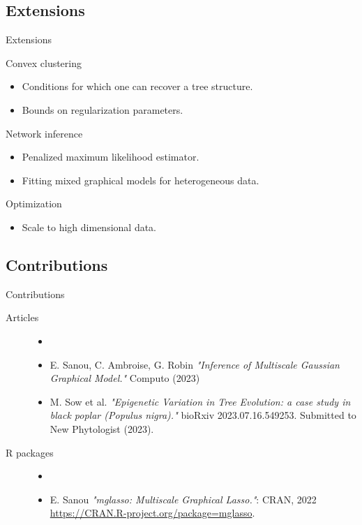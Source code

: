 \documentclass[11pt]{beamer}
\newcommand{\emphase}[1]{\textcolor{Complement}{#1}}
\begin{document}
\subsection{Extensions}
\begin{frame}{Extensions}
\begin{block}{Convex clustering}
\begin{itemize}
\item Conditions for which one can recover a tree structure.
\item Bounds on regularization parameters.
\end{itemize}
\end{block}

\begin{block}{Network inference}
\begin{itemize}
\item Penalized maximum likelihood estimator.
\item Fitting \emphase{mixed graphical models} for heterogeneous data.
\end{itemize}
\end{block}
 
\begin{block}{Optimization}
\begin{itemize}
\item Scale to high dimensional data.
\end{itemize}
\end{block}
\end{frame}

\subsection{Contributions}
\begin{frame}{Contributions}
\begin{description}
\item[Articles] \begin{itemize}
\item[]\vspace{-0.5cm}\small
\item E. Sanou, C. Ambroise, G. Robin \textit{"Inference of Multiscale Gaussian Graphical Model."} \emphase{Computo} (2023)\vspace{0.2cm}
\item  M. Sow et al. \textit{"Epigenetic Variation in Tree Evolution: a case study in black poplar (Populus nigra)."}  bioRxiv 2023.07.16.549253. \emphase{Submitted to New Phytologist} (2023).
\end{itemize}\vspace{0.5cm}
\item[R packages] \begin{itemize}
\item[]\vspace{-0.5cm}\normalsize
\item E. Sanou \textit{"\emphase{mglasso}: Multiscale Graphical Lasso."}: CRAN, 2022 \url{https://CRAN.R-project.org/package=mglasso}.\vspace{0.2cm}
\end{itemize}
\end{description}  
\end{frame}
\end{document}

